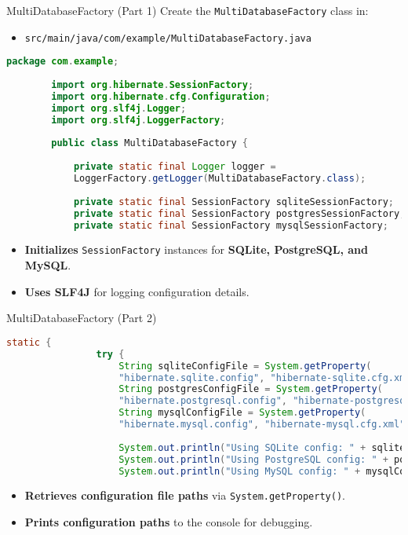 \documentclass[aspectratio=169, table]{beamer}
\begin{document}
\begin{frame}[fragile]{MultiDatabaseFactory (Part 1)}
	\vspace{20pt}
	Create the \texttt{MultiDatabaseFactory} class in:
	\begin{itemize}
		\item \texttt{src/main/java/com/example/MultiDatabaseFactory.java}
	\end{itemize}
	
	\begin{lstlisting}[language=Java, style=JavaStyle]
		package com.example;
		
		import org.hibernate.SessionFactory;
		import org.hibernate.cfg.Configuration;
		import org.slf4j.Logger;
		import org.slf4j.LoggerFactory;
		
		public class MultiDatabaseFactory {
			
			private static final Logger logger = 
			LoggerFactory.getLogger(MultiDatabaseFactory.class);
			
			private static final SessionFactory sqliteSessionFactory;
			private static final SessionFactory postgresSessionFactory;
			private static final SessionFactory mysqlSessionFactory;
		\end{lstlisting}

		\begin{itemize}
			\item \textbf{Initializes} \texttt{SessionFactory} instances for \textbf{SQLite, PostgreSQL, and MySQL}.
			\item \textbf{Uses SLF4J} for logging configuration details.
		\end{itemize}
	\end{frame}
	
	\begin{frame}[fragile]{MultiDatabaseFactory (Part 2)}
		\vspace{20pt}
		\begin{lstlisting}[language=Java, style=JavaStyle, firstnumber=15]
			static {
				try {
					String sqliteConfigFile = System.getProperty(
					"hibernate.sqlite.config", "hibernate-sqlite.cfg.xml");
					String postgresConfigFile = System.getProperty(
					"hibernate.postgresql.config", "hibernate-postgresql.cfg.xml");
					String mysqlConfigFile = System.getProperty(
					"hibernate.mysql.config", "hibernate-mysql.cfg.xml");
					
					System.out.println("Using SQLite config: " + sqliteConfigFile);
					System.out.println("Using PostgreSQL config: " + postgresConfigFile);
					System.out.println("Using MySQL config: " + mysqlConfigFile);
				\end{lstlisting}

				\begin{itemize}
					\item \textbf{Retrieves configuration file paths} via \texttt{System.getProperty()}.
					\item \textbf{Prints configuration paths} to the console for debugging.
				\end{itemize}
			\end{frame}
			
\end{document}
